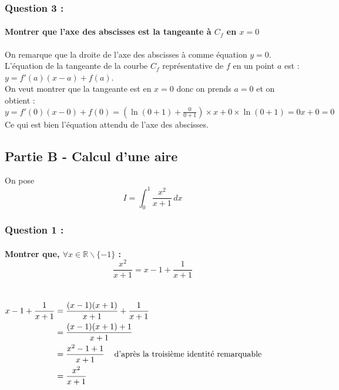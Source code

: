 \documentclass[a4paper, 12pt]{article}
\begin{document}
{}
\subsubsection*{Question 3 :}
\paragraph*{Montrer que l'axe des abscisses est la tangeante à $C_f$ en $x=0$ \\[5mm]}

On remarque que la droite de l'axe des abscisses à comme équation $y = 0$.
\\
L'équation de la tangeante de la courbe $C_f$ représentative de $f$ en un point $a$ est : 
$y = f'(a)(x-a) + f(a)$.
\\
On veut montrer que la tangeante est en $x=0$ donc on prends $a=0$ et on obtient :
\\
$y = f'(0)(x-0) + f(0) = (\ln{\left( 0 + 1 \right)} + \frac{0}{0+1})\times x + 0 \times \ln{\left( 0 + 1 \right)}= 0x + 0 = 0$
\\[1mm]
Ce qui est bien l'équation attendu de l'axe des abscisses.

{}
\subsection*{Partie B - Calcul d'une aire}
\noindent
On pose 
\[I = \int_{0}^{1} \frac{x^2}{x+1} \,dx\]

{}
\subsubsection*{Question 1 :}
\paragraph*{Montrer que, $\forall x \in \mathds{R} \backslash \{-1\}$ : \[  \frac{x^2}{x+1}=x-1 + \frac{1}{x+1}\] \\[5mm]}

$
\begin{aligned}
    x-1 + \frac{1}{x+1} 
    &= \frac{(x-1)(x+1)}{x+1}+\frac{1}{x+1} \\
    &= \frac{(x-1)(x+1) + 1}{x+1} \\
    &= \frac{x^2-1+1}{x+1} \text{\hspace{3mm} d'après la troisième identité remarquable} \\
    &= \frac{x^2}{x+1}
\end{aligned}
$
{}
\end{document}
